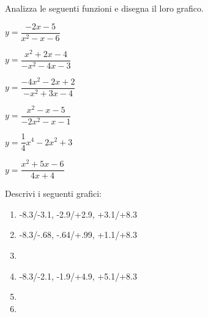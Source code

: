 \begin{esercizio}\label{ese:stufun.2e}
Analizza le seguenti funzioni e disegna il loro grafico.
\begin{multicols}{3}
 \begin{enumeratea}
  \item \(y = \dfrac{-2x-5}{x^2-x-6}\) \\ %
  \item \(y = \dfrac{x^2+2x-4}{-x^2-4x-3}\) %
  \item \(y = \dfrac{-4x^2-2x+2}{-x^2+3x-4}\) \\ %
  \item \(y = \dfrac{x^2-x-5}{-2x^2-x-1}\) %
  \item \(y = \dfrac{1}{4}x^4-2x^2+3\) \\ %
  \item \(y = \dfrac{x^2+5x-6}{4x+4}\) %
 \end{enumeratea}
\end{multicols}
\end{esercizio}

\bigskip

\begin{esercizio}\label{ese:stufun.3g}
Descrivi i seguenti grafici:
\begin{multicols}{2}
 \begin{enumerate} [left=0pt, label=\alph*)]
  \item \myp 
{} 
{-8.3/-3.1, -2.9/+2.9, +3.1/+8.3}%
  \item \myp 
{} 
{-8.3/-.68, -.64/+.99, +1.1/+8.3}%
  \item \myp 
{}%
  \item \myp 
{} 
{-8.3/-2.1, -1.9/+4.9, +5.1/+8.3}%
\item \myp 
{}%
\item \myp 
{}%
 \end{enumerate}
\end{multicols}
\end{esercizio}

